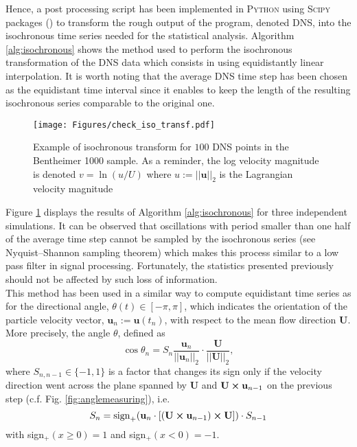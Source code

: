 Hence, a post processing script has been implemented in \textsc{Python} using \textsc{Scipy} packages (\cite{scipy}) to transform the rough output of the program, denoted DNS, into the isochronous time series needed for the statistical analysis.
Algorithm \ref{alg:isochronous} shows the method used to perform the isochronous transformation of the DNS data which consists in using equidistantly linear interpolation.
It is worth noting that the average DNS time step has been chosen as the equidistant time interval since it enables to keep the length of the resulting isochronous series comparable to the original one.\\
\begin{figure}
	\centering
	\texttt{[image: Figures/check\_iso\_transf.pdf]}
	\caption{Example of isochronous transform for $100$ DNS points in the Bentheimer 1000 sample. As a reminder, the log velocity magnitude is denoted $v=\ln{(u/U)}$ where $u:=||\textbf{u}||_2$ is the Lagrangian velocity magnitude}
	\label{fig:checkisotransf}
\end{figure}
Figure \ref{fig:checkisotransf} displays the results of Algorithm \ref{alg:isochronous} for three independent simulations.
It can be observed that oscillations with period smaller than one half of the average time step cannot be sampled by the isochronous series (see Nyquist–Shannon sampling theorem) which makes this process similar to a low pass filter in signal processing.
Fortunately, the statistics presented previously should not be affected by such loss of information.\\

This method has been used in a similar way to compute equidistant time series as for the directional angle, $\theta (t)\in[-\pi,\pi]$, which indicates the orientation of the particle velocity vector, $\textbf{u}_n :=\textbf{u}(t_n)$, with respect to the mean flow direction $\textbf{U}$.
More precisely, the angle $\theta$, defined as
\begin{equation}
\cos \theta_n = S_{n} \frac{\textbf{u}_n}{||\textbf{u}_n||_2 }\cdot \frac{\textbf{U}}{||\textbf{U}||_2},
\end{equation}
where $S_{n,n-1}\in\{-1,1\}$ is a factor that changes its sign only if the velocity direction went across the plane spanned by $\textbf{U}$ and $\textbf{U}\cross\textbf{u}_{n-1}$ on the previous step (c.f. Fig. \ref{fig:anglemeasuring}), i.e.
\begin{equation}
S_{n} = \mathrm{sign}_+(\textbf{u}_n\cdot [(\textbf{U}\cross\textbf{u}_{n-1})\cross \textbf{U}])\cdot S_{n-1} 
\end{equation}
with sign$_+(x\geq 0)=1$ and sign$_+(x< 0)=-1$.

